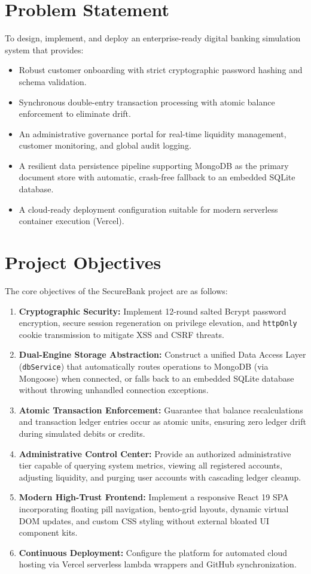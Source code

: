 \section{Problem Statement}
To design, implement, and deploy an enterprise-ready digital banking simulation system that provides:
\begin{itemize}
    \item Robust customer onboarding with strict cryptographic password hashing and schema validation.
    \item Synchronous double-entry transaction processing with atomic balance enforcement to eliminate drift.
    \item An administrative governance portal for real-time liquidity management, customer monitoring, and global audit logging.
    \item A resilient data persistence pipeline supporting MongoDB as the primary document store with automatic, crash-free fallback to an embedded SQLite database.
    \item A cloud-ready deployment configuration suitable for modern serverless container execution (Vercel).
\end{itemize}

\section{Project Objectives}
The core objectives of the SecureBank project are as follows:
\begin{enumerate}
    \item \textbf{Cryptographic Security:} Implement 12-round salted Bcrypt password encryption, secure session regeneration on privilege elevation, and \texttt{httpOnly} cookie transmission to mitigate XSS and CSRF threats.
    \item \textbf{Dual-Engine Storage Abstraction:} Construct a unified Data Access Layer (\texttt{dbService}) that automatically routes operations to MongoDB (via Mongoose) when connected, or falls back to an embedded SQLite database without throwing unhandled connection exceptions.
    \item \textbf{Atomic Transaction Enforcement:} Guarantee that balance recalculations and transaction ledger entries occur as atomic units, ensuring zero ledger drift during simulated debits or credits.
    \item \textbf{Administrative Control Center:} Provide an authorized administrative tier capable of querying system metrics, viewing all registered accounts, adjusting liquidity, and purging user accounts with cascading ledger cleanup.
    \item \textbf{Modern High-Trust Frontend:} Implement a responsive React 19 SPA incorporating floating pill navigation, bento-grid layouts, dynamic virtual DOM updates, and custom CSS styling without external bloated UI component kits.
    \item \textbf{Continuous Deployment:} Configure the platform for automated cloud hosting via Vercel serverless lambda wrappers and GitHub synchronization.
\end{enumerate}

